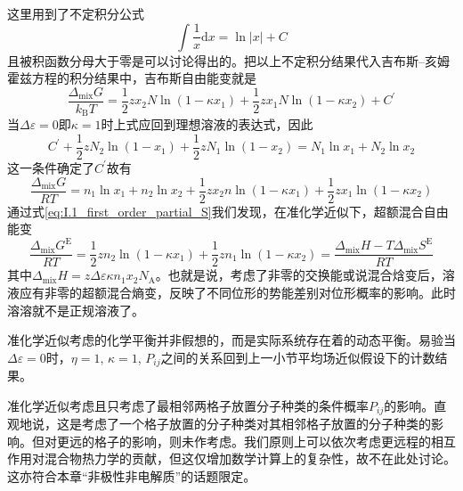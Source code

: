 \documentclass[main.tex]{subfiles}
\begin{document}
这里用到了不定积分公式
\[\int\frac{1}{x}\mathrm{d}x=\ln\left|x\right|+C\]
且被积函数分母大于零是可以讨论得出的。把以上不定积分结果代入吉布斯--亥姆霍兹方程的积分结果中，吉布斯自由能变就是
\[\frac{\Delta_\text{mix}G}{k_\text{B}T}=\frac{1}{2}zx_2N\ln\left(1-\kappa x_1\right)+\frac{1}{2}zx_1N\ln\left(1-\kappa x_2\right)+C^\prime\]
当$\Delta\varepsilon=0$即$\kappa=1$时上式应回到理想溶液的表达式，因此
\[C^\prime+\frac{1}{2}zN_2\ln\left(1-x_1\right)+\frac{1}{2}zN_1\ln\left(1-x_2\right)=N_1\ln x_1+N_2\ln x_2\]
这一条件确定了$C^\prime$故有
\begin{equation}
  \frac{\Delta_\text{mix}G}{RT}=n_1\ln x_1+n_2\ln x_2+\frac{1}{2}zx_2n\ln\left(1-\kappa x_1\right)+\frac{1}{2}zx_1\ln\left(1-\kappa x_2\right)
\end{equation}
通过式\eqref{eq:I.1_first_order_partial_S}我们发现，在准化学近似下，超额混合自由能变
\[\frac{\Delta_\text{mix}G^\text{E}}{RT}=\frac{1}{2}zn_2\ln\left(1-\kappa x_1\right)+\frac{1}{2}zn_1\ln\left(1-\kappa x_2\right)=\frac{\Delta_\text{mix}H-T\Delta_\text{mix}S^\text{E}}{RT}\]
其中$\Delta_\text{mix}H=z\Delta\varepsilon\kappa n_1 x_2 N_\text{A}$。也就是说，考虑了非零的交换能或说混合焓变后，溶液应有非零的超额混合熵变，反映了不同位形的势能差别对位形概率的影响。此时溶溶就不是正规溶液了。

准化学近似考虑的化学平衡并非假想的，而是实际系统存在着的动态平衡。易验当$\Delta\varepsilon=0$时，$\eta=1$, $\kappa=1$, $P_{ij}$之间的关系回到上一小节平均场近似假设下的计数结果。

准化学近似考虑且只考虑了最相邻两格子放置分子种类的条件概率$P_{ij}$的影响。直观地说，这是考虑了一个格子放置的分子种类对其相邻格子放置的分子种类的影响。但对更远的格子的影响，则未作考虑。我们原则上可以依次考虑更远程的相互作用对混合物热力学的贡献，但这仅增加数学计算上的复杂性，故不在此处讨论。这亦符合本章“非极性非电解质”的话题限定。
\end{document}
